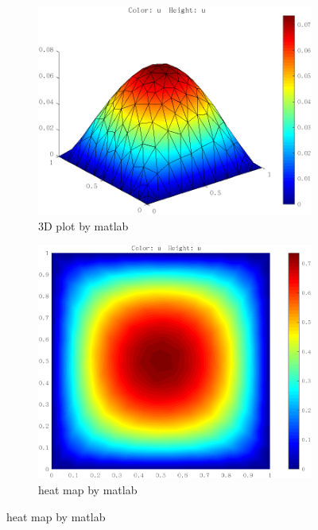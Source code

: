 \begin{figure}[H]
    \centering  
    \begin{subfigure}{0.5\textwidth}  
        \centering  
        \includegraphics[width=0.9\linewidth]{./pics/final/possion/2d/matlabf13D.png}  
        \caption{3D plot by matlab}  
    \end{subfigure}%
    \begin{subfigure}{0.5\textwidth}  
        \centering  
        \includegraphics[width=0.9\linewidth]{./pics/final/possion/2d/matlabf1heatmap.png}  
        \caption{heat map by matlab}
    \end{subfigure}  
\end{figure} 

